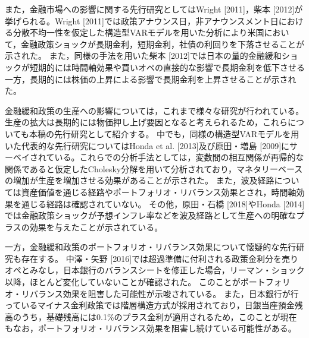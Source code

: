 \documentclass[12pt]{jarticle}
\begin{document}
{また，金融市場への影響に関する先行研究としてはWright [2011]，柴本 [2012]が挙げられる。Wright [2011]では政策アナウンス日，非アナウンスメント日における分散不均一性を仮定した構造型VARモデルを用いた分析により米国において，金融政策ショックが長期金利，短期金利，社債の利回りを下落させることが示された。
また，同様の手法を用いた柴本 [2012]では日本の量的金融緩和ショックが短期的には時間軸効果や買いオペの直接的な影響で長期金利を低下させる一方，長期的には株価の上昇による影響で長期金利を上昇させることが示された。

金融緩和政策の生産への影響については，これまで様々な研究が行われている。生産の拡大は長期的には物価押し上げ要因となると考えられるため，これらについても本稿の先行研究として紹介する。
中でも，同様の構造型VARモデルを用いた代表的な先行研究についてはHonda et al. [2013]及び原田・増島 [2009]にサーベイされている。これらでの分析手法としては，変数間の相互関係が再帰的な関係であると仮定したCholesky分解を用いて分析されており，マネタリーベースの増加が生産を増加させる効果があることが示された。
また，波及経路については資産価値を通じる経路やポートフォリオ・リバランス効果とされ，時間軸効果を通じる経路は確認されていない。
その他，原田・石橋 [2018]やHonda [2014]では金融政策ショックが予想インフレ率などを波及経路として生産への明確なプラスの効果を与えたことが示されている。

一方，金融緩和政策のポートフォリオ・リバランス効果について懐疑的な先行研究も存在する。
中澤・矢野 [2016]では超過準備に付利される政策金利分を売りオペとみなし，日本銀行のバランスシートを修正した場合，リーマン・ショック以降，ほとんど変化していないことが確認された。
このことがポートフォリオ・リバランス効果を阻害した可能性が示唆されている。
また，日本銀行が行っているマイナス金利政策では階層構造方式が採用されており，日銀当座預金残高のうち，基礎残高には0.1\%のプラス金利が適用されるため，このことが現在もなお，ポートフォリオ・リバランス効果を阻害し続けている可能性がある。

}
\end{document}
